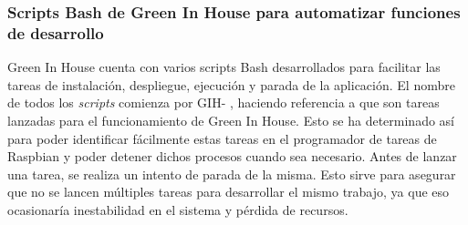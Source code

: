         \subsubsection{Scripts Bash de Green In House para automatizar funciones de desarrollo}
        Green In House cuenta con varios scripts Bash desarrollados para facilitar las tareas de instalación, despliegue, ejecución y parada de la aplicación. El nombre de todos los \textit{scripts} comienza por GIH- , haciendo referencia a que son tareas lanzadas para el funcionamiento de Green In House. Esto se ha determinado así para poder identificar fácilmente estas tareas en el programador de tareas de Raspbian y poder detener dichos procesos cuando sea necesario. Antes de lanzar una tarea, se realiza un intento de parada de la misma. Esto sirve para asegurar que no se lancen múltiples tareas para desarrollar el mismo trabajo, ya que eso ocasionaría inestabilidad en el sistema y pérdida de recursos.
